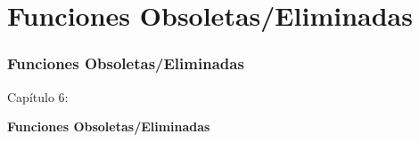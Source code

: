 %

\section{Funciones Obsoletas/Eliminadas}
\begin{frame}[fragile]
	\frametitle{Funciones Obsoletas/Eliminadas}

	\begin{center}\huge{Capítulo 6:}\end{center}
	\begin{center}\huge{\color{typo3darkgrey}\textbf{Funciones Obsoletas/Eliminadas}}\end{center}

\end{frame}


